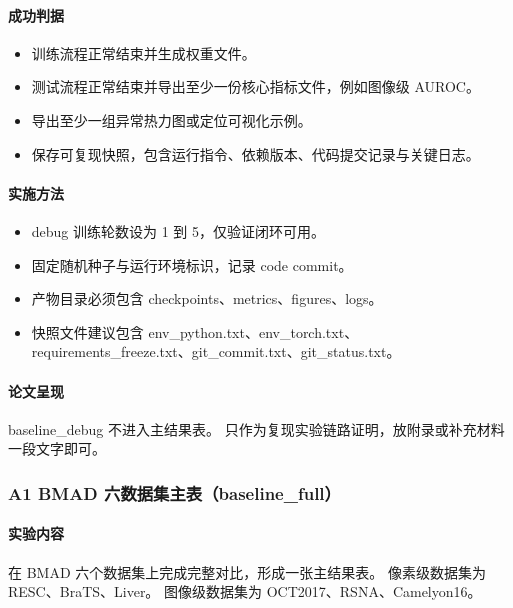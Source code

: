 \documentclass[UTF8,a4paper]{ctexart}
\begin{document}
\paragraph{成功判据}
\begin{itemize}
  \item 训练流程正常结束并生成权重文件。
  \item 测试流程正常结束并导出至少一份核心指标文件，例如图像级 AUROC。
  \item 导出至少一组异常热力图或定位可视化示例。
  \item 保存可复现快照，包含运行指令、依赖版本、代码提交记录与关键日志。
\end{itemize}

\paragraph{实施方法}
\begin{itemize}
  \item debug 训练轮数设为 1 到 5，仅验证闭环可用。
  \item 固定随机种子与运行环境标识，记录 code commit。
  \item 产物目录必须包含 checkpoints、metrics、figures、logs。
  \item 快照文件建议包含 env\_python.txt、env\_torch.txt、requirements\_freeze.txt、git\_commit.txt、git\_status.txt。
\end{itemize}

\paragraph{论文呈现}
baseline\_debug 不进入主结果表。
只作为复现实验链路证明，放附录或补充材料一段文字即可。

\subsubsection{A1 BMAD 六数据集主表（baseline\_full）}

\paragraph{实验内容}
在 BMAD 六个数据集上完成完整对比，形成一张主结果表。
像素级数据集为 RESC、BraTS、Liver。
图像级数据集为 OCT2017、RSNA、Camelyon16。
\end{document}
